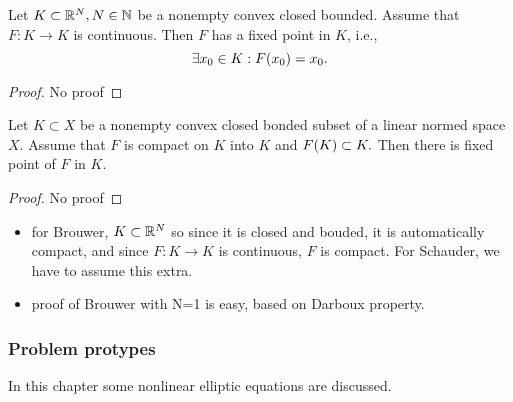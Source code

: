 \documentclass{article}
\begin{document}
\begin{theorem}
    Let $K \subset {\mathbb R}^N, N \in {\mathbb N}$ be a nonempty convex closed bounded. Assume that $F: K \to K$ is continuous. Then $F$ has a fixed point in $K$, i.e.,
    \[
	    \exists x_0 \in K: F\qty(x_{0}) = x_0.
    \]
\end{theorem}
\begin{proof}
    No proof
\end{proof}
\begin{theorem}
    Let $K \subset X$ be a nonempty convex closed bonded subset of a linear normed space $X$. Assume that $F$ is compact on $K$ into $K$ and $F\qty(K) \subset K.$ Then there is fixed point of $F$ in $K.$
\end{theorem}
\begin{proof}
    No proof
\end{proof}
\begin{itemize}
	\item for Brouwer, $K \subset {\mathbb R}^N$ so since it is closed and bouded, it is automatically compact, and since $F: K \to K$ is continuous, $F$ is compact. For Schauder, we have to assume this extra.
	\item proof of Brouwer with N=1 is easy, based on Darboux property.
\end{itemize}
\subsubsection{Problem protypes}
\label{sec:prototypes}
In this chapter some nonlinear elliptic equations are discussed.
\end{document}

